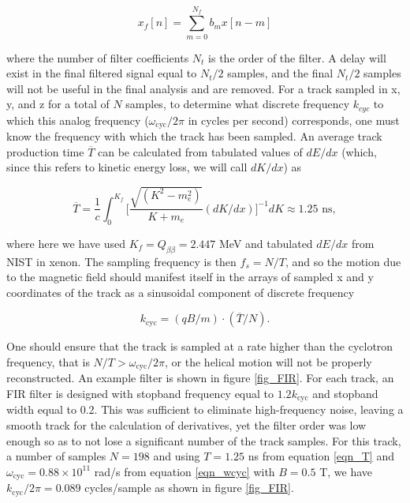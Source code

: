 \documentclass{JINST}
\begin{document}
\begin{equation}
x_{f}[n] = \sum_{m=0}^{N_f} b_{m}x[n-m]
\end{equation}

\noindent where the number of filter coefficients $N_{t}$ is the order of the filter.  A delay will exist in the
final filtered signal equal to $N_{t}/2$ samples, and the final $N_{t}/2$ samples will not be useful in the final analysis
and are removed.
For a track sampled in x, y, and z for a total of $N$ samples, to determine what discrete frequency $k_{cyc}$ to which
this analog frequency ($\omega_{\mathrm{cyc}}/2\pi$ in cycles per second) corresponds, one must know the frequency 
with which the track has been sampled.  An average track production time $\overline{T}$ can be calculated from 
tabulated values of $dE/dx$ (which, since this refers to kinetic energy loss, we will call $dK/dx$) as

\begin{equation}\label{eqn_T}
\overline{T} = \frac{1}{c}\int_{0}^{K_{f}} \biggl[\frac{\sqrt{(K^2-m_e^2)}}{K+m_e}(dK/dx)\biggr]^{-1} dK \approx 1.25 \,\, \mathrm{ns},
\end{equation}

\noindent where here we have used $K_{f} = Q_{\beta\beta} = 2.447$ MeV and tabulated 
$dE/dx$ from NIST \cite{NIST_mac} in xenon.  The sampling frequency is then $f_{s} = N/T$, and so the motion
due to the magnetic field should manifest itself in the arrays of sampled x and y coordinates
of the track as a sinusoidal component of discrete frequency 

\begin{equation}\label{eqn_kcyc}
k_{\mathrm{cyc}} = (qB/m)\cdot(\overline{T}/N).
\end{equation}

One should ensure that the track is sampled at a rate higher than the cyclotron
frequency, that is $N/T > \omega_{\mathrm{cyc}}/2\pi$, or the helical motion will not be properly
reconstructed.  An example filter is shown in figure \ref{fig_FIR}.  For each track, an FIR filter is designed with 
stopband frequency equal to $1.2k_{\mathrm{cyc}}$ and stopband width equal to 0.2.  This was sufficient to 
eliminate high-frequency noise, leaving a smooth track for the calculation of derivatives, yet the filter order was
low enough so as to not lose a significant number of the track samples.  For this track, a number of samples 
$N = 198$ and using $T = 1.25$ ns from equation \ref{eqn_T} and $\omega_{\mathrm{cyc}} = 0.88 \times 
10^{11}$ rad/s from equation \ref{eqn_wcyc} with $B = 0.5$ T, we have $k_{\mathrm{cyc}}/2\pi = 0.089$ 
cycles/sample as shown in figure \ref{fig_FIR}.
\end{document}
